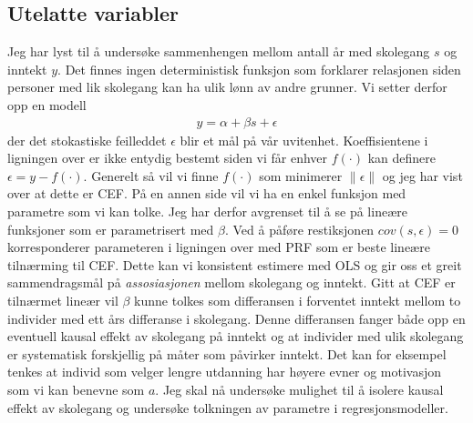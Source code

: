 \subsection{Utelatte variabler}
Jeg har lyst til å undersøke sammenhengen mellom antall år med skolegang $s$ og inntekt $y$. Det finnes ingen deterministisk funksjon som forklarer relasjonen siden personer med lik skolegang kan ha ulik lønn av andre grunner. Vi setter derfor opp en modell
\begin{align}
y=\alpha+\beta s + \epsilon
\end{align}
der det stokastiske feilleddet $\epsilon$ blir et mål på vår uvitenhet. Koeffisientene i ligningen over er ikke entydig bestemt siden vi får enhver $f(\cdot)$ kan definere $\epsilon = y-f(\cdot)$. Generelt så vil vi finne $f(\cdot)$ som minimerer $\| \epsilon \|$ og jeg har vist over at dette er CEF. På en annen side vil vi ha en enkel funksjon med parametre som vi kan tolke. Jeg har derfor avgrenset til å se på lineære funksjoner som er parametrisert med $\beta$. Ved å påføre restiksjonen $cov(s,\epsilon)=0$ korresponderer parameteren i ligningen over med PRF som er beste lineære tilnærming til CEF. Dette kan vi konsistent estimere med OLS og gir oss et greit sammendragsmål på \textit{assosiasjonen} mellom skolegang og inntekt. Gitt at CEF er tilnærmet lineær vil $\beta$ kunne tolkes som differansen i forventet inntekt mellom to individer med ett års differanse i skolegang. Denne differansen fanger både opp en eventuell kausal effekt av skolegang på inntekt og at individer med ulik skolegang er systematisk forskjellig på måter som påvirker inntekt. Det kan for eksempel tenkes at individ som velger lengre utdanning har høyere evner og motivasjon som vi kan benevne som $a$. Jeg skal nå undersøke mulighet til å isolere kausal effekt av skolegang og undersøke tolkningen av parametre i regresjonsmodeller.

